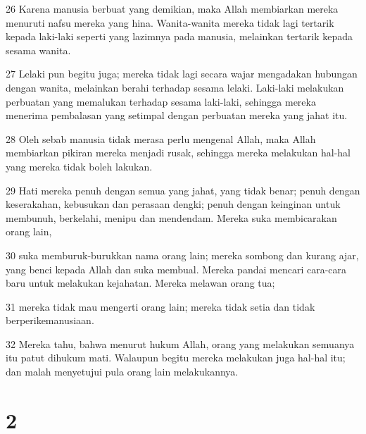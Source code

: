 \par 26 Karena manusia berbuat yang demikian, maka Allah membiarkan mereka menuruti nafsu mereka yang hina. Wanita-wanita mereka tidak lagi tertarik kepada laki-laki seperti yang lazimnya pada manusia, melainkan tertarik kepada sesama wanita.
\par 27 Lelaki pun begitu juga; mereka tidak lagi secara wajar mengadakan hubungan dengan wanita, melainkan berahi terhadap sesama lelaki. Laki-laki melakukan perbuatan yang memalukan terhadap sesama laki-laki, sehingga mereka menerima pembalasan yang setimpal dengan perbuatan mereka yang jahat itu.
\par 28 Oleh sebab manusia tidak merasa perlu mengenal Allah, maka Allah membiarkan pikiran mereka menjadi rusak, sehingga mereka melakukan hal-hal yang mereka tidak boleh lakukan.
\par 29 Hati mereka penuh dengan semua yang jahat, yang tidak benar; penuh dengan keserakahan, kebusukan dan perasaan dengki; penuh dengan keinginan untuk membunuh, berkelahi, menipu dan mendendam. Mereka suka membicarakan orang lain,
\par 30 suka memburuk-burukkan nama orang lain; mereka sombong dan kurang ajar, yang benci kepada Allah dan suka membual. Mereka pandai mencari cara-cara baru untuk melakukan kejahatan. Mereka melawan orang tua;
\par 31 mereka tidak mau mengerti orang lain; mereka tidak setia dan tidak berperikemanusiaan.
\par 32 Mereka tahu, bahwa menurut hukum Allah, orang yang melakukan semuanya itu patut dihukum mati. Walaupun begitu mereka melakukan juga hal-hal itu; dan malah menyetujui pula orang lain melakukannya.

\chapter{2}

